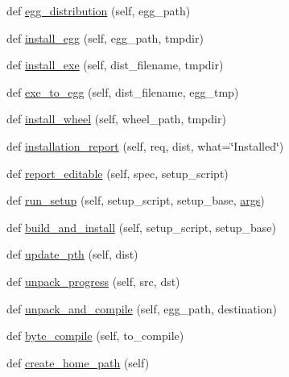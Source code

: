 \begin{DoxyCompactItemize}
\item 
def \hyperlink{classsetuptools_1_1command_1_1easy__install_1_1easy__install_a5fa017fde5091939435dde025aa7cc74}{egg\+\_\+distribution} (self, egg\+\_\+path)
\item 
def \hyperlink{classsetuptools_1_1command_1_1easy__install_1_1easy__install_a04769d37e9ac958b38314bf794fed23d}{install\+\_\+egg} (self, egg\+\_\+path, tmpdir)
\item 
def \hyperlink{classsetuptools_1_1command_1_1easy__install_1_1easy__install_aa6205c453a7e8eefbf75ec80ee93195d}{install\+\_\+exe} (self, dist\+\_\+filename, tmpdir)
\item 
def \hyperlink{classsetuptools_1_1command_1_1easy__install_1_1easy__install_a6f10cb0ea951a92815d653d2c0dca597}{exe\+\_\+to\+\_\+egg} (self, dist\+\_\+filename, egg\+\_\+tmp)
\item 
def \hyperlink{classsetuptools_1_1command_1_1easy__install_1_1easy__install_a8a20ba6cb31fbb5ac027c3593be89118}{install\+\_\+wheel} (self, wheel\+\_\+path, tmpdir)
\item 
def \hyperlink{classsetuptools_1_1command_1_1easy__install_1_1easy__install_a401fe17bba1bfa778030054fc488f71b}{installation\+\_\+report} (self, req, dist, what=\char`\"{}Installed\char`\"{})
\item 
def \hyperlink{classsetuptools_1_1command_1_1easy__install_1_1easy__install_a62dd708c151639a2e438dc6b2e3dcf6c}{report\+\_\+editable} (self, spec, setup\+\_\+script)
\item 
def \hyperlink{classsetuptools_1_1command_1_1easy__install_1_1easy__install_aff0f996fb5c3f10a22f9537a6a77a0a9}{run\+\_\+setup} (self, setup\+\_\+script, setup\+\_\+base, \hyperlink{classsetuptools_1_1command_1_1easy__install_1_1easy__install_a245326eef92af2fd2490071ec2fa271b}{args})
\item 
def \hyperlink{classsetuptools_1_1command_1_1easy__install_1_1easy__install_aedb975b7cb24ab74e468302387685233}{build\+\_\+and\+\_\+install} (self, setup\+\_\+script, setup\+\_\+base)
\item 
def \hyperlink{classsetuptools_1_1command_1_1easy__install_1_1easy__install_a46dbe3c7aef71b1ef5de0b72d1648c32}{update\+\_\+pth} (self, dist)
\item 
def \hyperlink{classsetuptools_1_1command_1_1easy__install_1_1easy__install_a3b605b714f5561607bf7d4615ee7ced9}{unpack\+\_\+progress} (self, src, dst)
\item 
def \hyperlink{classsetuptools_1_1command_1_1easy__install_1_1easy__install_aae5fc3f2c8f88abfa4cd229f05393fd0}{unpack\+\_\+and\+\_\+compile} (self, egg\+\_\+path, destination)
\item 
def \hyperlink{classsetuptools_1_1command_1_1easy__install_1_1easy__install_ac60bc1c1e9e4c905fc13e10a873fc46f}{byte\+\_\+compile} (self, to\+\_\+compile)
\item 
def \hyperlink{classsetuptools_1_1command_1_1easy__install_1_1easy__install_a978d8026468f5e011d38fd2129feb577}{create\+\_\+home\+\_\+path} (self)
\end{DoxyCompactItemize}
